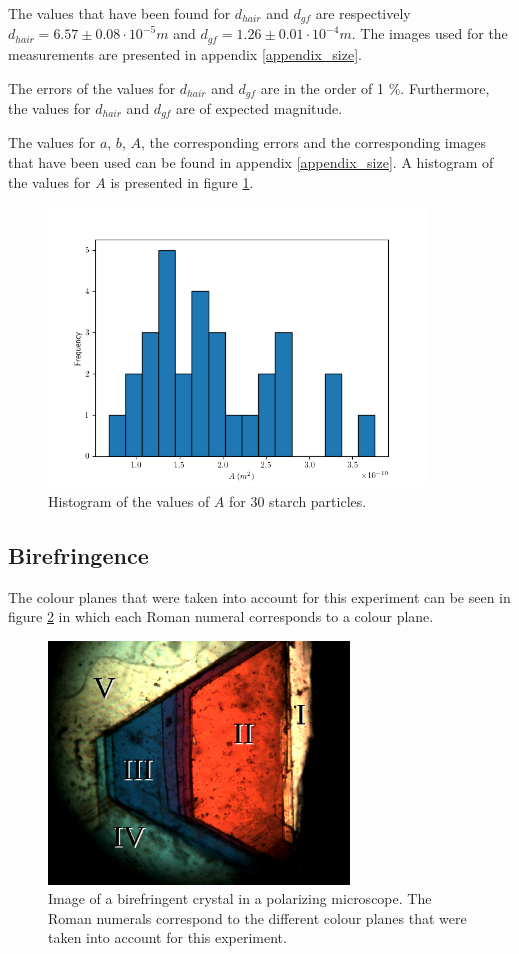 The values that have been found for $d_{hair}$ and $d_{gf}$ are respectively $d_{hair} = 6.57 \pm 0.08 \cdot 10^{-5} m $ and $d_{gf} =  1.26 \pm 0.01 \cdot 10^{-4} m $. The images used for the measurements are presented in appendix \ref{appendix_size}.

The errors of the values for $d_{hair}$ and $d_{gf}$ are in the order of 1 \%. Furthermore, the values for $d_{hair}$ and $d_{gf}$ are of expected magnitude. 

The values for $a$, $b$, $A$, the corresponding errors and the corresponding images that have been used can be found in appendix \ref{appendix_size}. A histogram of the values for $A$ is presented in figure \ref{fig_histogram_zetmeel}.

\begin{figure}[h!]
	\centering  
    \includegraphics[width=10cm,keepaspectratio]{afbeeldingen/histogram_zetmeel.png}
    \caption{Histogram of the values of $A$ for 30 starch particles.}
    \label{fig_histogram_zetmeel}
\end{figure}
    

\subsection{Birefringence}

The colour planes that were taken into account for this experiment can be seen in figure \ref{fig_bf_planes} in which each Roman numeral corresponds to a colour plane.

\begin{figure}[h!]
	\centering
	\includegraphics[width=8cm]{afbeeldingen/bf_colourplanes.png}
	\caption{Image of a birefringent crystal in a polarizing microscope. The Roman numerals correspond to the different colour planes that were taken into account for this experiment.}
	\label{fig_bf_planes}
\end{figure}


